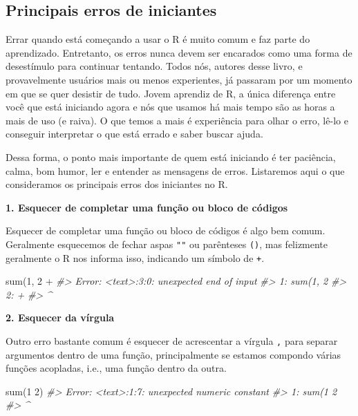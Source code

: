 \documentclass[
]{book}
\newenvironment{Shaded}{\begin{snugshade}}{\end{snugshade}}
\newcommand{\CommentTok}[1]{\textcolor[rgb]{0.37,0.37,0.37}{\textit{#1}}}
\newcommand{\DecValTok}[1]{\textcolor[rgb]{0.06,0.06,0.06}{#1}}
\newcommand{\FunctionTok}[1]{\textcolor[rgb]{0,0,0}{#1}}
\newcommand{\NormalTok}[1]{#1}
\newcommand{\SpecialCharTok}[1]{\textcolor[rgb]{0,0,0}{#1}}
\begin{document}
\hypertarget{principais-erros-de-iniciantes}{%
\subsection{Principais erros de iniciantes}\label{principais-erros-de-iniciantes}}

Errar quando está começando a usar o R é muito comum e faz parte do aprendizado. Entretanto, os erros nunca devem ser encarados como uma forma de desestímulo para continuar tentando. Todos nós, autores desse livro, e provavelmente usuários mais ou menos experientes, já passaram por um momento em que se quer desistir de tudo. Jovem aprendiz de R, a única diferença entre você que está iniciando agora e nós que usamos há mais tempo são as horas a mais de uso (e raiva). O que temos a mais é experiência para olhar o erro, lê-lo e conseguir interpretar o que está errado e saber buscar ajuda.

Dessa forma, o ponto mais importante de quem está iniciando é ter paciência, calma, bom humor, ler e entender as mensagens de erros. Listaremos aqui o que consideramos os principais erros dos iniciantes no R.

\textbf{1. Esquecer de completar uma função ou bloco de códigos}

Esquecer de completar uma função ou bloco de códigos é algo bem comum. Geralmente esquecemos de fechar aspas \texttt{""} ou parênteses \texttt{()}, mas felizmente geralmente o R nos informa isso, indicando um símbolo de \texttt{+}.

\begin{Shaded}
\begin{Highlighting}[]
\FunctionTok{sum}\NormalTok{(}\DecValTok{1}\NormalTok{, }\DecValTok{2}
  \SpecialCharTok{+}
\CommentTok{\#\textgreater{} Error: \textless{}text\textgreater{}:3:0: unexpected end of input}
\CommentTok{\#\textgreater{} 1: sum(1, 2}
\CommentTok{\#\textgreater{} 2:   +}
\CommentTok{\#\textgreater{}   \^{}}
\end{Highlighting}
\end{Shaded}

\textbf{2. Esquecer da vírgula}

Outro erro bastante comum é esquecer de acrescentar a vírgula \texttt{,} para separar argumentos dentro de uma função, principalmente se estamos compondo várias funções acopladas, i.e., uma função dentro da outra.

\begin{Shaded}
\begin{Highlighting}[]
\FunctionTok{sum}\NormalTok{(}\DecValTok{1} \DecValTok{2}\NormalTok{)}
\CommentTok{\#\textgreater{} Error: \textless{}text\textgreater{}:1:7: unexpected numeric constant}
\CommentTok{\#\textgreater{} 1: sum(1 2}
\CommentTok{\#\textgreater{}           \^{}}
\end{Highlighting}
\end{Shaded}
\end{document}
